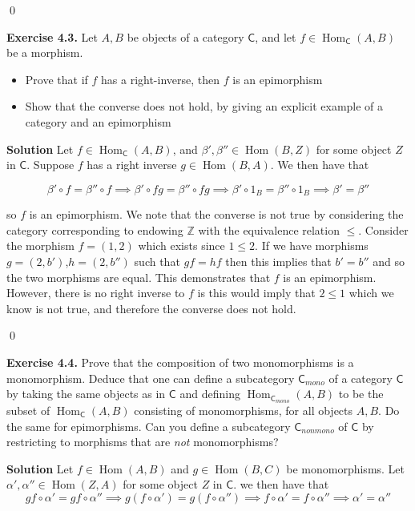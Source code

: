 \documentclass[titlepage]{article}
\newcommand{\Exercise}[1]{\textbf{Exercise #1}}
\newcommand{\Solution}{\textbf{Solution }}
\newcommand{\cat}[1]{\mathsf{#1}}
\newcommand{\Cat}{\cat{C}}
\DeclareMathOperator{\Hom}{Hom}
\begin{document}
\qed

\bigskip


\Exercise{4.3.} Let $A,B$ be objects of a category $\Cat$, and let $f \in \Hom_{\Cat}(A,B)$ be a morphism.
\begin{itemize}
    \item Prove that if $f$ has a right-inverse, then $f$ is an epimorphism
    \item Show that the converse does not hold, by giving an explicit example of a category and an epimorphism
\end{itemize}

\medskip

\Solution Let $f \in \Hom_{\Cat}(A,B)$, and $\beta',\beta'' \in \Hom(B,Z)$ for some object $Z$ in $\Cat$. Suppose $f$ has a right inverse $g \in \Hom(B,A)$. We then have that

\[\beta' \circ f = \beta'' \circ f \implies \beta' \circ fg = \beta'' \circ fg \implies \beta' \circ 1_B = \beta'' \circ 1_B \implies \beta' = \beta''\]

so $f$ is an epimorphism. We note that the converse is not true by considering the category corresponding to endowing $\mathbb{Z}$ with the equivalence relation $\leq$. Consider the morphism $f = (1,2)$ which exists since $1 \leq 2$. If we have morphisms $g = (2,b')$,$ h= (2,b'')$ such that $gf = hf$ then this implies that $b'=b''$ and so the two morphisms are equal. This demonstrates that $f$ is an epimorphism. However, there is no right inverse to $f$ is this would imply that $2 \leq 1$ which we know is not true, and therefore the converse does not hold.

\qed

\bigskip

\Exercise{4.4.} Prove that the composition of two monomorphisms is a monomorphism. Deduce that one can define a subcategory $\Cat_{mono}$ of a category $\Cat$ by taking the same objects as in $\Cat$ and defining $\Hom_{\Cat_{mono}}(A,B)$ to be the subset of $\Hom_{\Cat}(A,B)$ consisting of monomorphisms, for all objects $A,B$. Do the same for epimorphisms. Can you define a subcategory $\Cat_{nonmono}$ of $\Cat$ by restricting to morphisms that are \textit{not} monomorphisms?

\medskip

\Solution Let $f \in \Hom(A,B)$ and $g \in \Hom(B,C)$ be monomorphisms. Let $\alpha',\alpha'' \in \Hom(Z,A)$ for some object $Z$ in $\Cat$. we then have that
\[ gf \circ \alpha' = gf \circ \alpha'' \implies g(f \circ \alpha') = g(f \circ \alpha'') \implies f \circ \alpha' = f \circ \alpha'' \implies \alpha' = \alpha''\]
\end{document}
